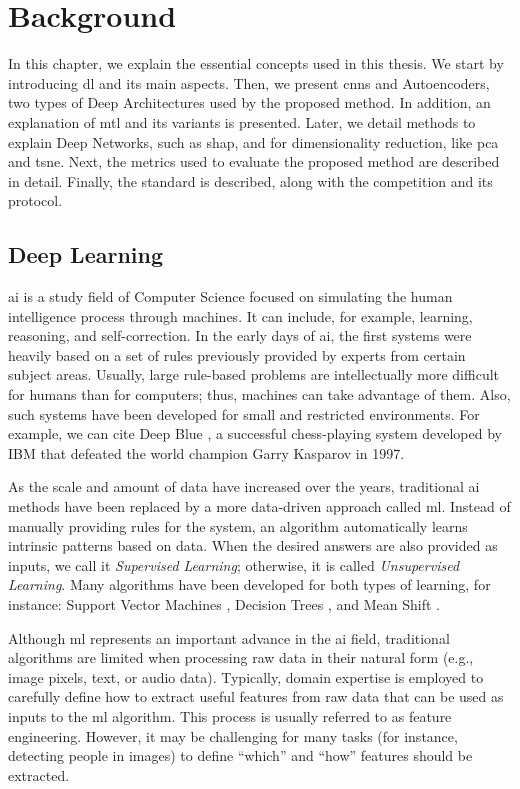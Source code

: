 \section{Background} \label{sec:background}

In this chapter, we explain the essential concepts used in this thesis. We start by introducing \acl{dl} and its main aspects. Then, we present \aclp{cnn} and Autoencoders, two types of Deep Architectures used by the proposed method. In addition, an explanation of \acl{mtl} and its variants is presented. Later, we detail methods to explain Deep Networks, such as \acs{shap}, and for dimensionality reduction, like \acl{pca} and \acs{tsne}. Next, the metrics used to evaluate the proposed method are described in detail. Finally, the \icao standard is described, along with the \fvcongoing competition and its protocol.

\subsection{Deep Learning}

\acf{ai} is a study field of Computer Science focused on simulating the human intelligence process through machines. It can include, for example, learning, reasoning, and self-correction. In the early days of \acs{ai}, the first systems were heavily based on a set of rules previously provided by experts from certain subject areas. Usually, large rule-based problems are intellectually more difficult for humans than for computers; thus, machines can take advantage of them. Also, such systems have been developed for small and restricted environments. For example, we can cite Deep Blue \citep{hsu2002behind}, a successful chess-playing system developed by IBM that defeated the world champion Garry Kasparov in 1997.

As the scale and amount of data have increased over the years, traditional \acs{ai} methods have been replaced by a more data-driven approach called \acf{ml}. Instead of manually providing rules for the system, an algorithm automatically learns intrinsic patterns based on data. When the desired answers are also provided as inputs, we call it \textit{Supervised Learning}; otherwise, it is called \textit{Unsupervised Learning}. Many algorithms have been developed for both types of learning, for instance: Support Vector Machines \citep{boser1992training}, Decision Trees \citep{breiman1984classification}, and Mean Shift \citep{fukunaga1975estimation}. 

Although \acl{ml} represents an important advance in the \acs{ai} field, traditional algorithms are limited when processing raw data in their natural form (e.g., image pixels, text, or audio data). Typically, domain expertise is employed to carefully define how to extract useful features from raw data that can be used as inputs to the \acs{ml} algorithm. This process is usually referred to as feature engineering. However, it may be challenging for many tasks (for instance, detecting people in images) to define ``which'' and ``how'' features should be extracted.

